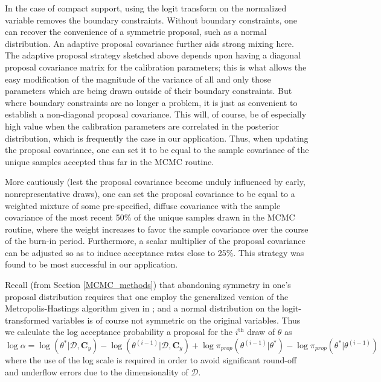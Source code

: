 \documentclass{article}
\begin{document}
In the case of compact support, using the logit transform on the normalized variable removes the boundary constraints. Without boundary constraints, one can recover the convenience of a symmetric proposal, such as a normal distribution. An adaptive proposal covariance further aids strong mixing here. The adaptive proposal strategy sketched above depends upon having a diagonal proposal covariance matrix for the calibration parameters; this is what allows the easy modification of the magnitude of the variance of all and only those parameters which are being drawn outside of their boundary constraints. But where boundary constraints are no longer a problem, it is just as convenient to establish a non-diagonal proposal covariance. This will, of course, be of especially high value when the calibration parameters are correlated in the posterior distribution, which is frequently the case in our application. Thus, when updating the proposal covariance, one can set it to be equal to the sample covariance of the unique samples accepted thus far in the MCMC routine. 

More cautiously (lest the proposal covariance become unduly influenced by early, nonrepresentative draws), one can set the proposal covariance to be equal to a weighted mixture of some pre-specified, diffuse covariance with the sample covariance of the most recent 50\% of the unique samples drawn in the MCMC routine, where the weight increases to favor the sample covariance over the course of the burn-in period. Furthermore, a scalar multiplier of the proposal covariance can be adjusted so as to induce acceptance rates close to 25\%. This strategy was found to be most successful in our application.

Recall (from Section \ref{MCMC_methods}) that abandoning symmetry in one's proposal distribution requires that one employ the generalized version of the Metropolis-Hastings algorithm given in \cite{Hastings1970}; and a normal distribution on the logit-transformed variables is of course not symmetric on the original variables. Thus we calculate the log acceptance probability a proposal for the $i^{\text{th}}$ draw of $\theta$ as 
\begin{equation}
\log \alpha = \log(\theta^*|\mathcal D, \mathbf C_y) - \log(\theta^{(i-1)}|\mathcal D,\mathbf C_y) + \log \pi_{prop}(\theta^{(i-1)}|\theta^*)
- \log \pi_{prop}(\theta^* |\theta^{(i-1)})
\end{equation}
where the use of the log scale is required in order to avoid significant round-off and underflow errors due to the dimensionality of $\mathcal D$.
\end{document}
